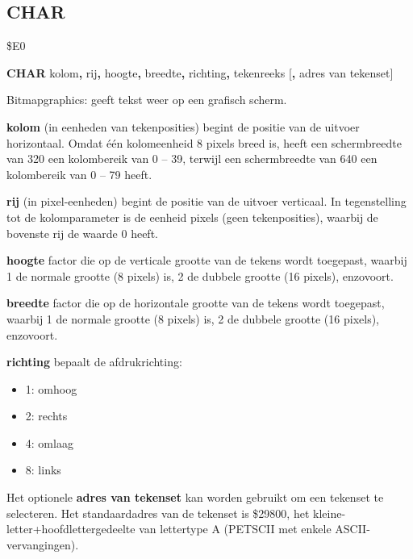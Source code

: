 \subsection{CHAR}
\begin{description}[leftmargin=2cm,style=nextline]
\item [Token:]   \$E0

\item [Formaat:]  {\bf CHAR} kolom{\bf,} rij{\bf,} hoogte{\bf,} breedte{\bf,} richting{\bf,} tekenreeks [{\bf,} adres van tekenset]

\item [Gebruik:]   Bitmapgraphics: geeft tekst weer op een grafisch scherm.

                 {\bf kolom} (in eenheden van tekenposities) begint de positie van de uitvoer horizontaal. Omdat één kolomeenheid 8 pixels breed is, heeft een schermbreedte van 320 een kolombereik van 0 -- 39, terwijl een schermbreedte van 640 een kolombereik van 0 -- 79 heeft.

                 {\bf rij} (in pixel-eenheden) begint de positie van de uitvoer verticaal. In tegenstelling tot de kolomparameter is de eenheid pixels (geen tekenposities), waarbij de bovenste rij de waarde 0 heeft.

                 {\bf hoogte} factor die op de verticale grootte van de tekens wordt toegepast, waarbij 1 de normale grootte (8 pixels) is, 2 de dubbele grootte (16 pixels), enzovoort.

                 {\bf breedte} factor die op de horizontale grootte van de tekens wordt toegepast, waarbij 1 de normale grootte (8 pixels) is, 2 de dubbele grootte (16 pixels), enzovoort.

                 {\bf richting} bepaalt de afdrukrichting:
                 \begin{itemize}
                    \item 1: omhoog                    \item 2: rechts                    \item 4: omlaag                    \item 8: links
                 \end{itemize}

                 Het optionele {\bf adres van tekenset} kan worden gebruikt om een tekenset te selecteren. Het standaardadres van de tekenset is \$29800, het kleine-letter+hoofdlettergedeelte van lettertype A (PETSCII met enkele ASCII-vervangingen).


\end{description}
